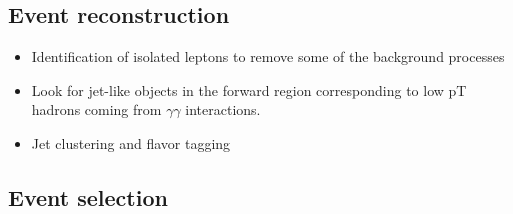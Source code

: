   \subsection{Event reconstruction}

  \begin{itemize}
    \item Identification of isolated leptons to remove some of the background processes
    \item Look for jet-like objects in the forward region corresponding to low pT hadrons coming from $\gamma \gamma$ interactions.
    \item Jet clustering and flavor tagging
  \end{itemize}

  \subsection{Event selection}
